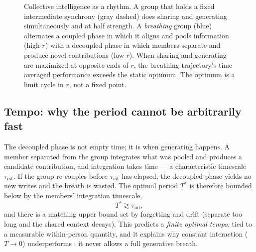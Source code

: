 \documentclass[11pt]{article}
\begin{document}
\begin{figure}[ht]
\centering
{}
\caption{Collective intelligence as a rhythm. A group that holds a fixed intermediate synchrony (gray dashed) does sharing and generating simultaneously and at half strength. A \emph{breathing} group (blue) alternates a coupled phase in which it aligns and pools information (high $r$) with a decoupled phase in which members separate and produce novel contributions (low $r$). When sharing and generating are maximized at opposite ends of $r$, the breathing trajectory's time-averaged performance exceeds the static optimum. The optimum is a limit cycle in $r$, not a fixed point.}
\label{fig:breathe}
\end{figure}

\subsection{Tempo: why the period cannot be arbitrarily fast}

The decoupled phase is not empty time; it is when generating happens. A member separated from the group integrates what was pooled and produces a candidate contribution, and integration takes time --- a characteristic timescale $\tau_{\text{int}}$. If the group re-couples before $\tau_{\text{int}}$ has elapsed, the decoupled phase yields no new writes and the breath is wasted. The optimal period $T^\ast$ is therefore bounded below by the members' integration timescale,
\begin{equation}
T^\ast \gtrsim \tau_{\text{int}},
\end{equation}
and there is a matching upper bound set by forgetting and drift (separate too long and the shared context decays). This predicts a \emph{finite optimal tempo}, tied to a measurable within-person quantity, and it explains why constant interaction ($T\to 0$) underperforms \citep{bernstein2018intermittent}: it never allows a full generative breath.
\end{document}
